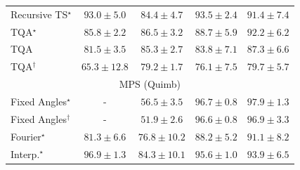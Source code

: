 \begin{tabular}{l|cccc|}
Recursive TS$^\star$ & {\cellcolor[HTML]{790D75}} \color[HTML]{F1F1F1} $93.0\pm 5.0$ & {\cellcolor[HTML]{8950A4}} \color[HTML]{F1F1F1} $84.4\pm 4.7$ & {\cellcolor[HTML]{740B70}} \color[HTML]{F1F1F1} $93.5\pm 2.4$ & {\cellcolor[HTML]{821580}} \color[HTML]{F1F1F1} $91.4\pm 7.4$ \\
TQA$^\star$ & {\cellcolor[HTML]{88459F}} \color[HTML]{F1F1F1} $85.8\pm 2.2$ & {\cellcolor[HTML]{88409C}} \color[HTML]{F1F1F1} $86.5\pm 3.2$ & {\cellcolor[HTML]{852D90}} \color[HTML]{F1F1F1} $88.7\pm 5.9$ & {\cellcolor[HTML]{810F7C}} \color[HTML]{F1F1F1} $92.2\pm 6.2$ \\
TQA & {\cellcolor[HTML]{8B65AE}} \color[HTML]{F1F1F1} $81.5\pm 3.5$ & {\cellcolor[HTML]{8949A1}} \color[HTML]{F1F1F1} $85.3\pm 2.7$ & {\cellcolor[HTML]{8A54A6}} \color[HTML]{F1F1F1} $83.8\pm 7.1$ & {\cellcolor[HTML]{873A98}} \color[HTML]{F1F1F1} $87.3\pm 6.6$ \\
TQA$^\dagger$ & {\cellcolor[HTML]{B4CCE2}} \color[HTML]{000000} $65.3\pm 12.8$ & {\cellcolor[HTML]{8C76B7}} \color[HTML]{F1F1F1} $79.2\pm 1.7$ & {\cellcolor[HTML]{8C8DC2}} \color[HTML]{F1F1F1} $76.1\pm 7.5$ & {\cellcolor[HTML]{8C72B5}} \color[HTML]{F1F1F1} $79.7\pm 5.7$ \\
\cline{1-5}
\multicolumn{5}{c}{\rule{0pt}{8pt}MPS (Quimb)} \\
\midrule
Fixed Angles$^\star$ & {\cellcolor[HTML]{000000}} \color[HTML]{F1F1F1} {\cellcolor{white}} \color{black} - & {\cellcolor[HTML]{FFF9C5}} \color[HTML]{000000} $56.5\pm 3.5$ & {\cellcolor[HTML]{712806}} \color[HTML]{F1F1F1} $96.7\pm 0.8$ & {\cellcolor[HTML]{662506}} \color[HTML]{F1F1F1} $97.9\pm 1.3$ \\
Fixed Angles$^\dagger$ & {\cellcolor[HTML]{000000}} \color[HTML]{F1F1F1} {\cellcolor{white}} \color{black} - & {\cellcolor[HTML]{FFFFE5}} \color[HTML]{000000} $51.9\pm 2.6$ & {\cellcolor[HTML]{712806}} \color[HTML]{F1F1F1} $96.6\pm 0.8$ & {\cellcolor[HTML]{702806}} \color[HTML]{F1F1F1} $96.9\pm 3.3$ \\
Fourier$^\star$ & {\cellcolor[HTML]{E86C12}} \color[HTML]{F1F1F1} $81.3\pm 6.6$ & {\cellcolor[HTML]{F88B22}} \color[HTML]{F1F1F1} $76.8\pm 10.2$ & {\cellcolor[HTML]{BC4503}} \color[HTML]{F1F1F1} $88.2\pm 5.2$ & {\cellcolor[HTML]{A33904}} \color[HTML]{F1F1F1} $91.1\pm 8.2$ \\
Interp.$^\star$ & {\cellcolor[HTML]{702806}} \color[HTML]{F1F1F1} $96.9\pm 1.3$ & {\cellcolor[HTML]{D85A09}} \color[HTML]{F1F1F1} $84.3\pm 10.1$ & {\cellcolor[HTML]{7B2B05}} \color[HTML]{F1F1F1} $95.6\pm 1.0$ & {\cellcolor[HTML]{892F05}} \color[HTML]{F1F1F1} $93.9\pm 6.5$ \\

\end{tabular}
